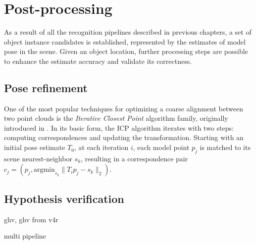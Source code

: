 
\chapter{Post-processing}
\label{cha:postproc}

As a result of all the recognition pipelines described in previous chapters, a set of object instance candidates is established, represented by the estimates of model pose in the scene. Given an object location, further processing steps are possible to enhance the estimate accuracy and validate its correctness.


\section{Pose refinement}
\label{sec:icp}

One of the most popular techniques for optimizing a coarse alignment between two point clouds is the \textit{Iterative Closest Point} algorithm family, originally introduced in \cite{icp-origin}. In its basic form, the ICP algorithm iterates with two steps: computing correspondences and updating the transformation. Starting with an initial pose estimate $T_0$, at each iteration $i$, each model point $p_j$ is matched to its scene nearest-neighbor $s_k$, resulting in a correspondence pair $c_j = (p_j, \mathrm{argmin}_{s_k} \lVert T_i p_j - s_k \rVert_2 )$.


\section{Hypothesis verification}
\label{sec:ghv}

ghv, ghv from v4r

multi pipeline